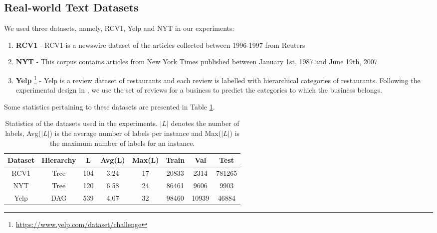 \documentclass[11pt,a4paper]{article}
\begin{document}
\subsection{Real-world Text Datasets}
We used three datasets, namely, RCV1, Yelp and NYT in our experiments:
\begin{enumerate}[label=(\arabic*),topsep=0pt,itemsep=-1ex,partopsep=1ex,parsep=1ex,leftmargin=*]
\item \textbf{RCV1} \citep{rcv1} - RCV1 is a newswire dataset of the articles collected between 1996-1997 from Reuters
\item \textbf{NYT} \citep{nytimes} - This corpus contains articles from New York Times published between January 1st, 1987 and June 19th, 2007
\item \textbf{Yelp} \footnote{\url{https://www.yelp.com/dataset/challenge}} - Yelp is a review dataset of restaurants and each review is labelled with hierarchical categories of restaurants. Following the experimental design in \citet{emnlp}, we use the set of reviews for a business to predict the categories to which the business belongs.
\end{enumerate}

Some statistics pertaining to these datasets are presented in Table \ref{tab:data}.

\begin{table}[H]
    \caption{Statistics of the datasets used in the experiments. $|L|$ denotes the number of labels,  Avg($|L|$) is the average number of labels per instance and Max($|L|$) is the maximum number of labels for an instance.}
    \label{tab:data}
    \begin{adjustbox}{max width=0.48\textwidth}
    \begin{tabular}{cccccccc} 
    \toprule
    \textbf{Dataset} & \textbf{Hierarchy} & \textbf{\textbar{}L\textbar{}} & \textbf{Avg(\textbar{}L\textbar{})} & \textbf{Max(\textbar{}L\textbar{})} & \textbf{Train} & \textbf{Val} & \textbf{Test} \\ 
    \hline
    RCV1 & Tree & 104 & 3.24 & 17 & 20833 & 2314 & 781265 \\
    NYT & Tree & 120 & 6.58 & 24 & 86461 & 9606 & 9903 \\
    Yelp & DAG & 539 & 4.07 & 32 & 98460 & 10939 & 46884 \\
    \bottomrule
    \end{tabular}
    \end{adjustbox}
\end{table}
\end{document}
